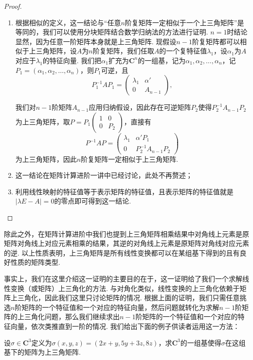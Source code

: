 \begin{proof}
    \begin{enumerate}
        \item 根据相似的定义，这一结论与``任意$n$阶复矩阵一定相似于一个上三角矩阵''是等同的，我们可以使用分块矩阵结合数学归纳法的方法进行证明. $n=1$时结论显然，因为任意一阶矩阵本身就是上三角矩阵. 现假设$n-1$阶复矩阵都可以相似于上三角矩阵，设$A$为$n$阶复矩阵，我们任取$A$的一个复特征值$\lambda_1$，设$\alpha_1$为$A$对应于$\lambda_1$的特征向量. 我们把$\alpha_1$扩充为$\mathbf{C}^n$的一组基，记为$\alpha_1,\alpha_2,\ldots,\alpha_n$，记$P_1=(\alpha_1,\alpha_2,\ldots,\alpha_n)$，则$P_1$可逆，且
              \[P_1^{-1}AP_1=\begin{pmatrix}
                      \lambda_1 & \alpha' \\ 0 & A_{n-1}
                  \end{pmatrix},\]

              我们对$n-1$阶矩阵$A_{n-1}$应用归纳假设，因此存在可逆矩阵$P_2$使得$P_2^{-1}A_{n-1}P_2$为上三角矩阵，取$P=P_1\begin{pmatrix}
                      1 & 0 \\ 0 & P_2
                  \end{pmatrix}$，直接有
              \[P^{-1}AP=\begin{pmatrix}
                      \lambda_1 & \alpha'P_1 \\ 0 & P_2^{-1}A_{n-1}P_2
                  \end{pmatrix}\]
              为上三角矩阵，因此$n$阶复矩阵一定相似于上三角矩阵.

        \item 这一结论在矩阵计算进阶一讲中已经讨论，此处不再赘述；

        \item 利用线性映射的特征值等于表示矩阵的特征值，且表示矩阵的特征值就是$|\lambda E-A|=0$的零点即可得到这一结论.
    \end{enumerate}
\end{proof}

除此之外，在矩阵计算进阶中我们也提到上三角矩阵相乘结果中对角线上元素是原矩阵对角线上对应元素相乘的结果，其逆的对角线上元素是原矩阵对角线对应元素的逆. 以上性质表明，上三角矩阵是所有线性变换都可以在某组基下得到的且有良好性质的矩阵类型.

事实上，我们在这里介绍这一证明的主要目的在于，这一证明给了我们一个求解线性变换（或矩阵）上三角化的方法. 与对角化类似，线性变换的上三角化依赖于矩阵上三角化，因此我们这里只讨论矩阵的情况. 根据上面的证明，我们只需任意挑选$n$阶矩阵的一个特征值和一个对应的特征向量，然后问题就转化为求解$n-1$阶矩阵的上三角化问题，那么我们继续求出$n-1$阶矩阵的一个特征值和一个对应的特征向量，依次类推直到一阶的情况. 我们给出下面的例子供读者运用这一方法：
\begin{example}
    设$\sigma\in\mathbf{C}^3$定义为$\sigma(x,y,z)=(2x+y,5y+3z,8z)$，求$\mathbf{C}^3$的一组基使得$\sigma$在这组基下的矩阵为上三角矩阵.
\end{example}

